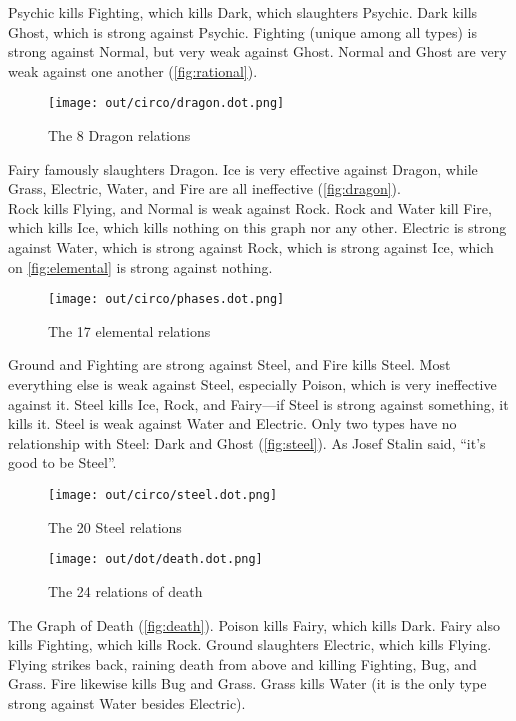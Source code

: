 \noindent{}Psychic kills Fighting, which kills Dark, which slaughters Psychic.
Dark kills Ghost, which is strong against Psychic.
Fighting (unique among all types) is strong against Normal,
  but very weak against Ghost.
Normal and Ghost are very weak against one another (\autoref{fig:rational}).

\begin{figure}[h!]
\centering
\texttt{[image: out/circo/dragon.dot.png]}
\caption{The 8 Dragon relations\label{fig:dragon}}
\end{figure}
\noindent{}Fairy famously slaughters Dragon.
Ice is very effective against Dragon, while Grass, Electric, Water, and Fire are all ineffective (\autoref{fig:dragon}).\\

\noindent{}Rock kills Flying, and Normal is weak against Rock.
Rock and Water kill Fire, which kills Ice, which kills nothing on this graph nor any other.
Electric is strong against Water, which is strong against Rock, which is strong against Ice,
 which on \autoref{fig:elemental} is strong against nothing.
\clearpage
\begin{figure}[ht]
\centering
\texttt{[image: out/circo/phases.dot.png]}
\caption{The 17 elemental relations\label{fig:elemental}}
\end{figure}

\noindent{}Ground and Fighting are strong against Steel, and Fire kills Steel.
Most everything else is weak against Steel, especially
 Poison, which is very ineffective against it.
Steel kills Ice, Rock, and Fairy---if Steel is strong against something, it kills it.
Steel is weak against Water and Electric.
Only two types have no relationship with Steel: Dark and Ghost (\autoref{fig:steel}).
As Josef Stalin said, ``it's good to be Steel''.
\begin{figure}[h!]
\centering
\texttt{[image: out/circo/steel.dot.png]}
\caption{The 20 Steel relations\label{fig:steel}}
\end{figure}

\clearpage
\begin{figure}[h!]
\centering
\texttt{[image: out/dot/death.dot.png]}
\caption{The 24 relations of death\label{fig:death}}
\end{figure}
\noindent{}The Graph of Death (\autoref{fig:death}).
Poison kills Fairy, which kills Dark.
Fairy also kills Fighting, which kills Rock.
Ground slaughters Electric, which kills Flying.
Flying strikes back, raining death from above and killing Fighting, Bug, and Grass.
Fire likewise kills Bug and Grass.
Grass kills Water (it is the only type strong against Water besides Electric).

